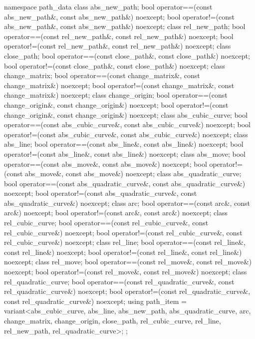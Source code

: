 \begin{codeblock}
{{{{  namespace path_data {
    class abs_new_path;
    bool operator==(const abs_new_path&, const abs_new_path&) noexcept;
    bool operator!=(const abs_new_path&, const abs_new_path&) noexcept;
    class rel_new_path;
    bool operator==(const rel_new_path&, const rel_new_path&) noexcept;
    bool operator!=(const rel_new_path&, const rel_new_path&) noexcept;
    class close_path;
    bool operator==(const close_path&, const close_path&) noexcept;
    bool operator!=(const close_path&, const close_path&) noexcept;
    class change_matrix;
    bool operator==(const change_matrix&, const change_matrix&) noexcept;
    bool operator!=(const change_matrix&, const change_matrix&) noexcept;
    class change_origin;
    bool operator==(const change_origin&, const change_origin&) noexcept;
    bool operator!=(const change_origin&, const change_origin&) noexcept;
    class abs_cubic_curve;
    bool operator==(const abs_cubic_curve&, const abs_cubic_curve&) noexcept;
    bool operator!=(const abs_cubic_curve&, const abs_cubic_curve&) noexcept;
    class abs_line;
    bool operator==(const abs_line&, const abs_line&) noexcept;
    bool operator!=(const abs_line&, const abs_line&) noexcept;
    class abs_move;
    bool operator==(const abs_move&, const abs_move&) noexcept;
    bool operator!=(const abs_move&, const abs_move&) noexcept;
    class abs_quadratic_curve;
    bool operator==(const abs_quadratic_curve&, const abs_quadratic_curve&) 
      noexcept;
    bool operator!=(const abs_quadratic_curve&, const abs_quadratic_curve&) 
      noexcept;
    class arc;
    bool operator==(const arc&, const arc&) noexcept;
    bool operator!=(const arc&, const arc&) noexcept;
    class rel_cubic_curve;
    bool operator==(const rel_cubic_curve&, const rel_cubic_curve&) noexcept;
    bool operator!=(const rel_cubic_curve&, const rel_cubic_curve&) noexcept;
    class rel_line;
    bool operator==(const rel_line&, const rel_line&) noexcept;
    bool operator!=(const rel_line&, const rel_line&) noexcept;
    class rel_move;
    bool operator==(const rel_move&, const rel_move&) noexcept;
    bool operator!=(const rel_move&, const rel_move&) noexcept;
    class rel_quadratic_curve;
    bool operator==(const rel_quadratic_curve&, const rel_quadratic_curve&) 
      noexcept;
    bool operator!=(const rel_quadratic_curve&, const rel_quadratic_curve&) 
      noexcept;
    using path_item = variant<abs_cubic_curve, abs_line, abs_new_path,
      abs_quadratic_curve, arc, change_matrix, change_origin, close_path,
      rel_cubic_curve, rel_line, rel_new_path, rel_quadratic_curve>;
  };
  
}}}}
\end{codeblock}
